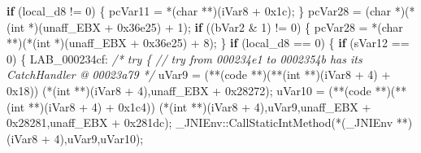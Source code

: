 \documentclass[
]{article}
\newenvironment{Shaded}{}{}
\newcommand{\BaseNTok}[1]{\textcolor[rgb]{0.25,0.63,0.44}{#1}}
\newcommand{\CommentTok}[1]{\textcolor[rgb]{0.38,0.63,0.69}{\textit{#1}}}
\newcommand{\ControlFlowTok}[1]{\textcolor[rgb]{0.00,0.44,0.13}{\textbf{#1}}}
\newcommand{\DataTypeTok}[1]{\textcolor[rgb]{0.56,0.13,0.00}{#1}}
\newcommand{\DecValTok}[1]{\textcolor[rgb]{0.25,0.63,0.44}{#1}}
\newcommand{\NormalTok}[1]{#1}
\newcommand{\OperatorTok}[1]{\textcolor[rgb]{0.40,0.40,0.40}{#1}}
\begin{document}
\begin{Shaded}
\begin{Highlighting}[]
    \ControlFlowTok{if} \OperatorTok{(}\NormalTok{local\_d8 }\OperatorTok{!=} \DecValTok{0}\OperatorTok{)} \OperatorTok{\{}
\NormalTok{      pcVar11 }\OperatorTok{=} \OperatorTok{*(}\DataTypeTok{char} \OperatorTok{**)(}\NormalTok{iVar8 }\OperatorTok{+} \BaseNTok{0x1c}\OperatorTok{);}
    \OperatorTok{\}}
\NormalTok{    pcVar28 }\OperatorTok{=} \OperatorTok{(}\DataTypeTok{char} \OperatorTok{*)(*(}\DataTypeTok{int} \OperatorTok{*)(}\NormalTok{unaff\_EBX }\OperatorTok{+} \BaseNTok{0x36e25}\OperatorTok{)} \OperatorTok{+} \DecValTok{1}\OperatorTok{);}
    \ControlFlowTok{if} \OperatorTok{((}\NormalTok{bVar2 }\OperatorTok{\&} \DecValTok{1}\OperatorTok{)} \OperatorTok{!=} \DecValTok{0}\OperatorTok{)} \OperatorTok{\{}
\NormalTok{      pcVar28 }\OperatorTok{=} \OperatorTok{*(}\DataTypeTok{char} \OperatorTok{**)(*(}\DataTypeTok{int} \OperatorTok{*)(}\NormalTok{unaff\_EBX }\OperatorTok{+} \BaseNTok{0x36e25}\OperatorTok{)} \OperatorTok{+} \DecValTok{8}\OperatorTok{);}
    \OperatorTok{\}}
    \ControlFlowTok{if} \OperatorTok{(}\NormalTok{local\_d8 }\OperatorTok{==} \DecValTok{0}\OperatorTok{)} \OperatorTok{\{}
      \ControlFlowTok{if} \OperatorTok{(}\NormalTok{sVar12 }\OperatorTok{==} \DecValTok{0}\OperatorTok{)} \OperatorTok{\{}
\NormalTok{LAB\_000234cf}\OperatorTok{:}
                    \CommentTok{/* try \{ // try from 000234e1 to 0002354b has its CatchHandler @ 00023a79 */}
\NormalTok{        uVar9 }\OperatorTok{=} \OperatorTok{(**(}\NormalTok{code }\OperatorTok{**)(**(}\DataTypeTok{int} \OperatorTok{**)(}\NormalTok{iVar8 }\OperatorTok{+} \DecValTok{4}\OperatorTok{)} \OperatorTok{+} \BaseNTok{0x18}\OperatorTok{))}
                          \OperatorTok{(*(}\DataTypeTok{int} \OperatorTok{**)(}\NormalTok{iVar8 }\OperatorTok{+} \DecValTok{4}\OperatorTok{),}\NormalTok{unaff\_EBX }\OperatorTok{+} \BaseNTok{0x28272}\OperatorTok{);}
\NormalTok{        uVar10 }\OperatorTok{=} \OperatorTok{(**(}\NormalTok{code }\OperatorTok{**)(**(}\DataTypeTok{int} \OperatorTok{**)(}\NormalTok{iVar8 }\OperatorTok{+} \DecValTok{4}\OperatorTok{)} \OperatorTok{+} \BaseNTok{0x1c4}\OperatorTok{))}
                           \OperatorTok{(*(}\DataTypeTok{int} \OperatorTok{**)(}\NormalTok{iVar8 }\OperatorTok{+} \DecValTok{4}\OperatorTok{),}\NormalTok{uVar9}\OperatorTok{,}\NormalTok{unaff\_EBX }\OperatorTok{+} \BaseNTok{0x28281}\OperatorTok{,}\NormalTok{unaff\_EBX }\OperatorTok{+} \BaseNTok{0x281dc}\OperatorTok{);}
\NormalTok{        \_JNIEnv}\OperatorTok{::}\NormalTok{CallStaticIntMethod}\OperatorTok{(*(}\NormalTok{\_JNIEnv }\OperatorTok{**)(}\NormalTok{iVar8 }\OperatorTok{+} \DecValTok{4}\OperatorTok{),}\NormalTok{uVar9}\OperatorTok{,}\NormalTok{uVar10}\OperatorTok{);}

\end{Highlighting}
\end{Shaded}
\end{document}
